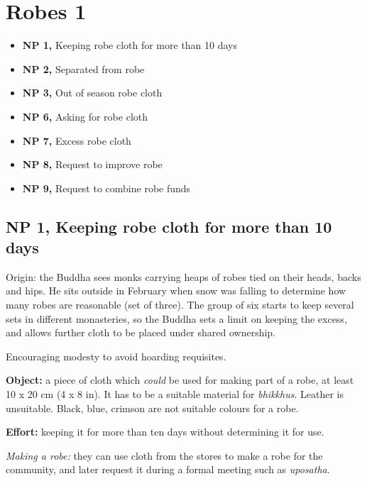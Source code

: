 \chapter{Robes 1}

\begin{itemize}
\tightlist
\item
  \textbf{NP 1,} Keeping robe cloth for more than 10 days
\item
  \textbf{NP 2,} Separated from robe
\item
  \textbf{NP 3,} Out of season robe cloth
\item
  \textbf{NP 6,} Asking for robe cloth
\item
  \textbf{NP 7,} Excess robe cloth
\item
  \textbf{NP 8,} Request to improve robe
\item
  \textbf{NP 9,} Request to combine robe funds
\end{itemize}


\vspace*{-2\baselineskip}

\section{NP 1, Keeping robe cloth for more than 10 days}

\enlargethispage{2\baselineskip}

Origin: the Buddha sees monks carrying heaps of robes tied on their
heads, backs and hips. He sits outside in February when snow was falling
to determine how many robes are reasonable (set of three). The group of
six starts to keep several sets in different monasteries, so the Buddha
sets a limit on keeping the excess, and allows further cloth to be
placed under shared ownership.

Encouraging modesty to avoid hoarding requisites.

\textbf{Object:} a piece of cloth which \emph{could} be used for making
part of a robe, at least 10 x 20 cm (4 x 8 in). It has to be a suitable
material for \emph{bhikkhus}. Leather is unsuitable. Black, blue,
crimson are not suitable colours for a robe.

\textbf{Effort:} keeping it for more than ten days without determining
it for use.

\emph{Making a robe:} they can use cloth from the stores to make a robe
for the community, and later request it during a formal meeting such as
\emph{uposatha}.

